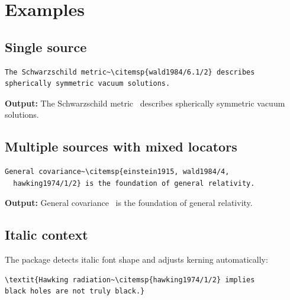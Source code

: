 \documentclass[11pt, a4paper]{article}
\begin{document}
\section{Examples}

\subsection{Single source}

\begin{tcolorbox}[colback=blue!3, colframe=blue!30, boxrule=0.5pt, arc=2pt, top=6pt, bottom=6pt, left=10pt, right=10pt]
\begin{verbatim}
The Schwarzschild metric~\citemsp{wald1984/6.1/2} describes
spherically symmetric vacuum solutions.
\end{verbatim}
\end{tcolorbox}

\noindent\textbf{Output:} The Schwarzschild metric~ describes spherically symmetric vacuum solutions.


\subsection{Multiple sources with mixed locators}

\begin{tcolorbox}[colback=blue!3, colframe=blue!30, boxrule=0.5pt, arc=2pt, top=6pt, bottom=6pt, left=10pt, right=10pt]
\begin{verbatim}
General covariance~\citemsp{einstein1915, wald1984/4,
  hawking1974/1/2} is the foundation of general relativity.
\end{verbatim}
\end{tcolorbox}

\noindent\textbf{Output:} General covariance~ is the foundation of general relativity.


\subsection{Italic context}

The package detects italic font shape and adjusts kerning automatically:

\begin{tcolorbox}[colback=blue!3, colframe=blue!30, boxrule=0.5pt, arc=2pt, top=6pt, bottom=6pt, left=10pt, right=10pt]
\begin{verbatim}
\textit{Hawking radiation~\citemsp{hawking1974/1/2} implies
black holes are not truly black.}
\end{verbatim}
\end{tcolorbox}
\end{document}
